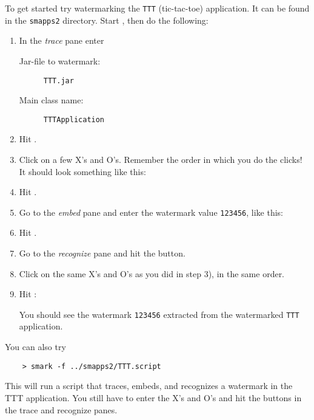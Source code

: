 To get started try watermarking the {\tt TTT}
(tic-tac-toe) application. It can be found in
the {\tt smapps2} directory. Start \SM, then 
do the following:
\begin{enumerate}
   \item In the {\em trace} pane enter
         \begin{description}
            \item[Jar-file to watermark:] {\tt TTT.jar}
            \item[Main class name:]       {\tt TTTApplication}
         \end{description}
   \item Hit .
   \item Click on a few X's and O's. Remember the order
         in which you do the clicks! It should look
         something like this:
         \begin{center}
         \end{center}
   \item Hit .
   \item Go to the {\em embed} pane and enter the watermark value {\tt 123456},
         like this:
         \begin{center}
         \end{center}
   \item Hit .
   \item Go to the {\em recognize} pane and hit the  button.
   \item Click on the same X's and O's as you did in step 3),
      in the same order.
   \item Hit :
         \begin{center}
         \end{center}
         You should see the watermark {\tt 123456} extracted from the 
         watermarked {\tt TTT} application.
\end{enumerate}

You can also try
\begin{verbatim}
    > smark -f ../smapps2/TTT.script
\end{verbatim}
This will run a script that traces, embeds, and
recognizes a watermark in the TTT application.
You still have to enter the X's and O's and
hit the  buttons in the trace and recognize
panes.